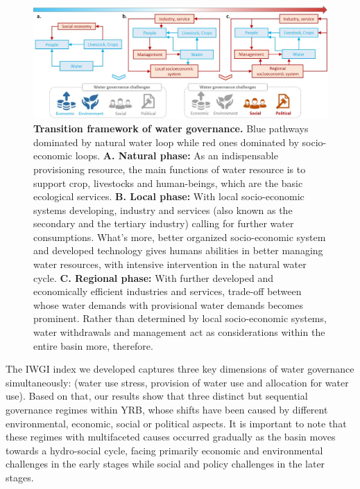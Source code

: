 \documentclass[9pt, twocolumn, twoside, lineno]{pnas-new}
\begin{document}
\begin{figure}[htbp!]
	\centering
	\includegraphics[width=\linewidth]{../../figures/main/transition.jpg}
	\caption{
		\textbf{Transition framework of water governance.} Blue pathways dominated by natural water loop while red ones dominated by socio-economic loops. 
		\textbf{A. Natural phase:} As an indispensable provisioning resource, the main functions of water resource is to support crop, livestocks and human-beings, which are the basic ecological services.
		\textbf{B. Local phase:} With local socio-economic systems developing, industry and services (also known as the secondary and the tertiary industry) calling for further water consumptions. What's more, better organized socio-economic system and developed technology gives humans abilities in better managing water resources, with intensive intervention in the natural water cycle. 
		\textbf{C. Regional phase:} With further developed and economically efficient industries and services, trade-off between whose water demands with provisional water demands becomes prominent. Rather than determined by local socio-economic systems, water withdrawals and management act as considerations within the entire basin more, therefore. 
	}
	\label{fig:summary}
\end{figure}

The IWGI index we developed captures three key dimensions of water governance simultaneously: (water use stress, provision of water use and allocation for water use). 
Based on that, our results show that three distinct but sequential governance regimes within YRB, whose shifts have been caused by different environmental, economic, social or political aspects.
It is important to note that these regimes with multifaceted causes occurred gradually as the basin moves towards a hydro-social cycle, facing primarily economic and environmental challenges in the early stages while social and policy challenges in the later stages.
\end{document}
